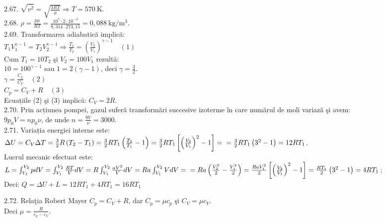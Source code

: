2.67. $\sqrt{\overline{v^{2}}}=\sqrt{\frac{3 R T}{\mu}} \Rightarrow T=570 \mathrm{~K}$.\\

2.68. $\rho=\frac{p \mu}{R T}=\frac{10^{5} \cdot 2 \cdot 10^{-3}}{8,314 \cdot 273,15}=0,088 \mathrm{~kg} / \mathrm{m}^{3}$.\\

2.69. Transformarea adiabatică implică:\\ $T_{1} V_{1}^{\gamma-1}=T_{2} V_{2}^{\gamma-1} \Rightarrow \frac{T_{1}}{T_{2}}=\left(\frac{V_{2}}{V_{1}}\right)^{\gamma-1} \quad (1)$\\ Cum $T_{1}=10 T_{2}$ şi $V_{2}=100 V_{1}$ rezultă:\\ $10=100^{\gamma-1}$ sau $1=2(\gamma-1)$, deci $\gamma=\frac{3}{2}$.\\ $\gamma=\frac{C_{p}}{C_{V}} \quad (2)$\\ $C_{p}=C_{V}+R \quad (3)$\\ Ecuațiile (2) şi (3) implică: $C_{V}=2 R$.\\

2.70. Prin acțiunea pompei, gazul suferă transformări succesive izoterme în care numărul de moli variază şi avem:\\ $9 p_{0} V=n p_{0} \nu$, de unde $n=\frac{9 V}{\nu}=3000$.\\

2.71. Variația energiei interne este:\\ $\Delta U=C_{V} \Delta T=\frac{3}{2} R\left(T_{2}-T_{1}\right)=\frac{3}{2} R T_{1}\left(\frac{T_{2}}{T_{1}}-1\right)=\frac{3}{2} R T_{1}\left[\left(\frac{V_{2}}{V_{1}}\right)^{2}-1\right]= \\ =\frac{3}{2} R T_{1}\left(3^{2}-1\right)=12 R T_{1}$.\\ Lucrul mecanic efectuat este:\\ $L=\int_{V_{1}}^{V_{2}} p d V=\int_{V_{1}}^{V_{2}} \frac{R T}{V} d V=R \int_{V_{1}}^{V_{2}} \frac{a V^{2}}{V} d V=R a \int_{V_{1}}^{V_{2}} V d V= \\ =R a\left(\frac{V_{2}^{2}}{2}-\frac{V_{1}^{2}}{2}\right)=\frac{R a V_{1}^{2}}{2}\left[\left(\frac{V_{2}}{V_{1}}\right)^{2}-1\right]=\frac{R T_{1}}{2}\left(3^{2}-1\right)=4 R T_{1}$;\\ Deci: $Q=\Delta U+L=12 R T_{1}+4 R T_{1}=16 R T_{1}$

2.72. Relaţia Robert Mayer $C_{p}=C_{V}+R$, dar $C_{p}=\mu c_{p}$ şi $C_{V}=\mu c_{V}$.\\ Deci $\mu=\frac{R}{c_{p}-c_{V}}$.\\

